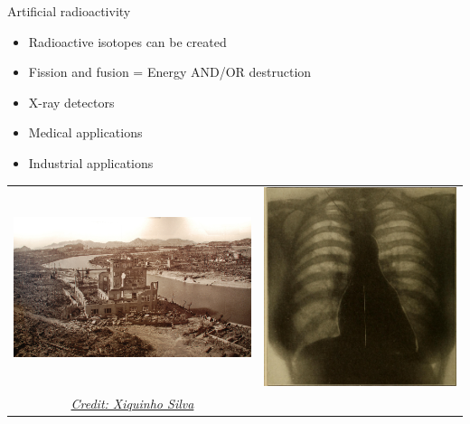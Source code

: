 \begin{frame}{Artificial radioactivity}

\begin{itemize}
\item Radioactive isotopes can be created 
\item Fission and fusion = Energy AND/OR destruction 
\item X-ray detectors 
\item Medical applications 
\item Industrial applications
\end{itemize}

\begin{table}
\begin{tabular}{cc}
\includegraphics[scale=0.25]{figures/5105065678_df5d2fd6a2_o} & \includegraphics[scale=0.025]{figures/14781624461_49afb948a1_o} \\
\href{https://www.flickr.com/photos/xiquinho/}{\emph{Credit: 
Xiquinho Silva}} & 
\end{tabular}
\end{table}

\end{frame}

